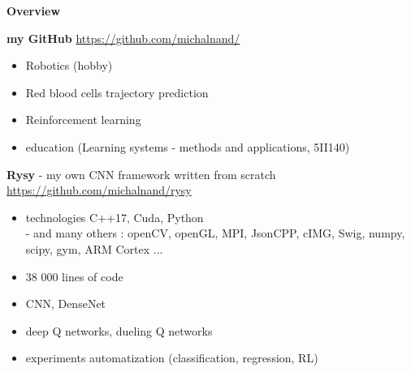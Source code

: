 \documentclass[xcolor=dvipsnames]{beamer}
\begin{document}
\begin{frame}{\bf Overview}

{\color{red} \bf my GitHub} \url{https://github.com/michalnand/}

\begin{itemize}
    \item Robotics (hobby)
    \item Red blood cells trajectory prediction
    \item Reinforcement learning
    \item education (Learning systems - methods and applications, 5II140)
\end{itemize}

{\color{red} \bf Rysy} - my own CNN framework written from scratch
{\footnotesize \url{https://github.com/michalnand/rysy}}


\begin{itemize}
    \item technologies C++17, Cuda, Python \\
        {\footnotesize - and many others : openCV, openGL, MPI, JsonCPP, cIMG, Swig, numpy, scipy, gym, ARM Cortex ...}
    \item 38 000 lines of code
    \item CNN, DenseNet
    \item deep Q networks, dueling Q networks
    \item experiments automatization (classification, regression, RL)
\end{itemize}

\end{frame}
\end{document}
